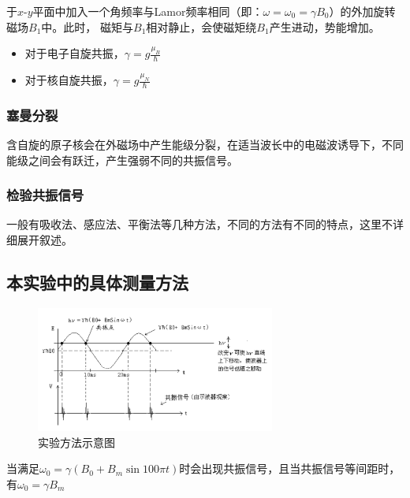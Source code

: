 \documentclass[a4paper,UTF8]{ctexart}
\begin{document}
于$x$-$y$平面中加入一个角频率与Lamor频率相同（即：$\omega=\omega_0=\gamma B_0$）的外加旋转磁场$B_1$中。此时，
磁矩与$B_1$相对静止，会使磁矩绕$B_1$产生进动，势能增加。

\begin{itemize}
    \item 对于电子自旋共振，$\gamma = g \frac{\mu_B}{\hbar }$
    \item 对于核自旋共振，$\gamma = g \frac{\mu_N}{\hbar}$
\end{itemize}

\subsubsection{塞曼分裂}

含自旋的原子核会在外磁场中产生能级分裂，在适当波长中的电磁波诱导下，不同能级之间会有跃迁，产生强弱不同的共振信号。

\subsubsection{检验共振信号}

一般有吸收法、感应法、平衡法等几种方法，不同的方法有不同的特点，这里不详细展开叙述。

\subsection{本实验中的具体测量方法}

\begin{figure}[H]
    \centering
    \begin{minipage}[b]{0.9\textwidth}
        \centering
        \includegraphics[width=0.7\textwidth]{./prin.png}
        \caption{实验方法示意图}
    \end{minipage}
\end{figure}

当满足$\omega_0 = \gamma (B_0+B_m \sin{100\pi t})$时会出现共振信号，且当共振信号等间距时，有$\omega_0 = \gamma B_m$
\end{document}
